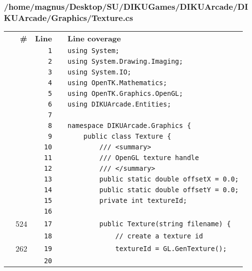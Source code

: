 \documentclass[a4paper,landscape,10pt]{article}
\begin{document}
\subsubsection{/home/magnus/Desktop/SU/DIKUGames/DIKUArcade/DIKUArcade/Graphics/Texture.cs}
\begin{longtable}[l]{lrrll}
\textbf{} & \textbf{\#} & \textbf{Line} & \textbf{} & \textbf{Line coverage}\\
\cellcolor{gray} &  & \verb~1~ & & \verb~using System;~\\
\cellcolor{gray} &  & \verb~2~ & & \verb~using System.Drawing.Imaging;~\\
\cellcolor{gray} &  & \verb~3~ & & \verb~using System.IO;~\\
\cellcolor{gray} &  & \verb~4~ & & \verb~using OpenTK.Mathematics;~\\
\cellcolor{gray} &  & \verb~5~ & & \verb~using OpenTK.Graphics.OpenGL;~\\
\cellcolor{gray} &  & \verb~6~ & & \verb~using DIKUArcade.Entities;~\\
\cellcolor{gray} &  & \verb~7~ & & \verb~~\\
\cellcolor{gray} &  & \verb~8~ & & \verb~namespace DIKUArcade.Graphics {~\\
\cellcolor{gray} &  & \verb~9~ & & \verb~    public class Texture {~\\
\cellcolor{gray} &  & \verb~10~ & & \verb~        /// <summary>~\\
\cellcolor{gray} &  & \verb~11~ & & \verb~        /// OpenGL texture handle~\\
\cellcolor{gray} &  & \verb~12~ & & \verb~        /// </summary>~\\
\cellcolor{gray} &  & \verb~13~ & & \verb~        public static double offsetX = 0.0;~\\
\cellcolor{gray} &  & \verb~14~ & & \verb~        public static double offsetY = 0.0;~\\
\cellcolor{gray} &  & \verb~15~ & & \verb~        private int textureId;~\\
\cellcolor{gray} &  & \verb~16~ & & \verb~~\\
\cellcolor{green} & 524 & \verb~17~ & & \verb~        public Texture(string filename) {~\\
\cellcolor{gray} &  & \verb~18~ & & \verb~            // create a texture id~\\
\cellcolor{green} & 262 & \verb~19~ & & \verb~            textureId = GL.GenTexture();~\\
\cellcolor{gray} &  & \verb~20~ & & \verb~~\\

\end{longtable}
\end{document}
